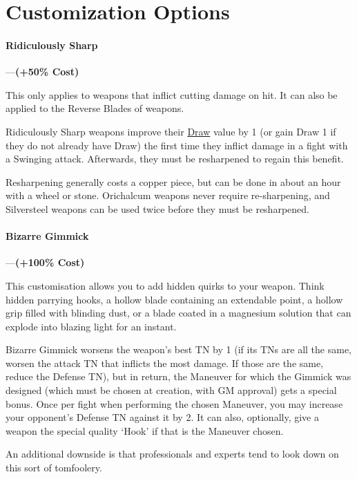 \documentclass[oneside,11pt,english]{book}
\begin{document}
\section{Customization Options}
\paragraph{\label{par:Ridiculously Sharp}Ridiculously Sharp}---\quad \textbf{(+50\% Cost)}\par
This only applies to weapons that inflict cutting damage on hit. It can also be applied to the Reverse Blades of weapons.

Ridiculously Sharp weapons improve their \hyperref[wepqual:Draw]{Draw} value by 1 (or gain Draw 1 if they do not already have Draw) the first time they inflict damage in a fight with a Swinging attack. Afterwards, they must be resharpened to regain this benefit.

Resharpening generally costs a copper piece, but can be done in about an hour with a wheel or stone. Orichalcum weapons never require re-sharpening, and Silversteel weapons can be used twice before they must be resharpened.

\paragraph{\label{par:Bizarre Gimmick}Bizarre Gimmick}---\quad \textbf{(+100\% Cost)}\par
This customisation allows you to add hidden quirks to your weapon. Think hidden parrying hooks, a hollow blade containing an extendable point, a hollow grip filled with blinding dust, or a blade coated in a magnesium solution that can explode into blazing light for an instant.

Bizarre Gimmick worsens the weapon’s best TN by 1 (if its TNs are all the same, worsen the attack TN that inflicts the most damage. If those are the same, reduce the Defense TN), but in return, the Maneuver for which the Gimmick was designed (which must be chosen at creation, with GM approval) gets a special bonus. Once per fight when performing the chosen Maneuver, you may increase your opponent’s Defense TN against it by 2. It can also, optionally, give a weapon the special quality ‘Hook’ if that is the Maneuver chosen.

An additional downside is that professionals and experts tend to look down on this sort of tomfoolery.
\end{document}
